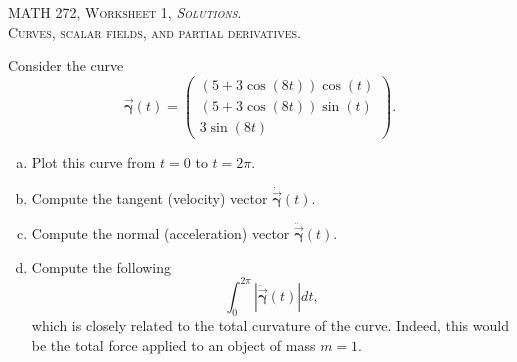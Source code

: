 \documentclass[12pt]{article} %
\newcommand{\curvegamma}{\boldsymbol{\vec{\gamma}}}
\newcommand{\tangentgamma}{\boldsymbol{\dot{\vec{\gamma}}}}
\newcommand{\normalgamma}{\boldsymbol{\ddot{\vec{\gamma}}}}
\begin{document}
\begin{center}
   \textsc{\large MATH 272, Worksheet 1, \emph{Solutions}.}\\
   \textsc{Curves, scalar fields, and partial derivatives.}
\end{center}
\vspace{.5cm}

\begin{problem}
    Consider the curve 
    \[
    \curvegamma(t) = \begin{pmatrix} (5+3\cos(8t))\cos(t) \\ (5+3\cos(8t))\sin(t) \\ 3\sin(8t) \end{pmatrix}.
    \]
    \begin{enumerate}[(a)]
        \item Plot this curve from $t=0$ to $t=2\pi$.
        \item Compute the tangent (velocity) vector $\tangentgamma(t)$.
        \item Compute the normal (acceleration) vector $\normalgamma(t)$.
        \item Compute the following 
        \[
        \int_0^{2\pi} \left| \normalgamma(t) \right| dt,
        \]
        which is closely related to the total curvature of the curve.  Indeed, this would be the total force applied to an object of mass $m=1$.
    \end{enumerate}
\end{problem}
\end{document}
